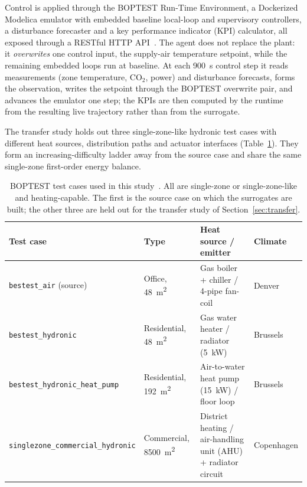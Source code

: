 Control is applied through the BOPTEST Run-Time Environment, a Dockerized Modelica emulator with
embedded baseline local-loop and supervisory controllers, a disturbance forecaster and a key performance indicator (KPI)
calculator, all exposed through a RESTful HTTP API~\cite{Arroyo2021GymBOPTEST}. The agent does not
replace the plant: it \emph{overwrites} one control input, the supply-air temperature setpoint,
while the remaining embedded loops run at baseline. At each \SI{900}{\second} control step it reads
measurements (zone temperature, CO$_2$, power) and disturbance forecasts, forms the observation,
writes the setpoint through the BOPTEST overwrite pair, and advances the emulator one step; the KPIs
are then computed by the runtime from the resulting live trajectory rather than from the surrogate.

The transfer study holds out three single-zone-like hydronic test cases with different heat sources,
distribution paths and actuator interfaces (Table~\ref{tab:testcases}). They form an
increasing-difficulty ladder away from the source case and share the same single-zone first-order
energy balance.

\begin{table}[!t]
\centering
\caption{BOPTEST test cases used in this study~\cite{Blum2021BOPTEST}. All are single-zone or
single-zone-like and heating-capable. The first is the source case on which the surrogates are
built; the other three are held out for the transfer study of Section~\ref{sec:transfer}.}
\small
\begin{tabular}{@{}llll@{}}
\toprule
Test case & Type & Heat source / emitter & Climate \\
\midrule
\texttt{bestest\_air} (source) & Office, \SI{48}{\meter\squared} & Gas boiler + chiller / 4-pipe fan-coil & Denver \\
\texttt{bestest\_hydronic} & Residential, \SI{48}{\meter\squared} & Gas water heater / radiator (\SI{5}{\kilo\watt}) & Brussels \\
\texttt{bestest\_hydronic\_heat\_pump} & Residential, \SI{192}{\meter\squared} & Air-to-water heat pump (\SI{15}{\kilo\watt}) / floor loop & Brussels \\
\texttt{singlezone\_commercial\_hydronic} & Commercial, \SI{8500}{\meter\squared} & District heating / air-handling unit (AHU) + radiator circuit & Copenhagen \\
\bottomrule
\end{tabular}
\label{tab:testcases}
\end{table}


